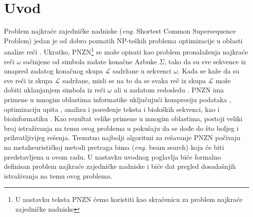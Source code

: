 \documentclass[12pt,oneside]{memoir}
\begin{document}
\frontmatter
\naslovna
\komisija
\apstrakt
\tableofcontents*

\mainmatter

\chapter{Uvod}
Problem najkraće zajedničke nadniske (\textit{eng.} Shortest Common Supersequence Problem)
jedan je od dobro poznatih NP-teških problema optimizacije u oblasti analize reči \cite{ProbabilisticBS}.
Ukratko, PNZN\footnote{U nastavku teksta PNZN ćemo koristiti kao skraćenicu za problem najkraće zajedničke nadniske}
se može opisati kao problem pronalaženja najkraće reči $\omega$ sačinjene
od simbola zadate konačne Azbuke $\Sigma$, tako da su sve sekvence iz unapred zadatog konačnog skupa
$\mathcal{L}$ sadržane u sekvenci $\omega$. Kada se kaže da su sve reči iz skupa $\mathcal{L}$
sadržane, misli se na to da se svaka reč iz skupa $\mathcal{L}$ može dobiti uklanjanjem simbola iz reči $\omega$ ali 
u zadatom redosledu \cite{SCSSProblemDef}. PNZN ima primene u mnogim oblastima informatike uključujući kompresiju podataka
\cite{DataCompression}, optimizaciju upita \cite{MQOptimization}, analizu i poređenje teksta i bioloških sekvenci, \cite{ITAlgorithms} \cite{SeqComparison}
kao i bioinformatiku \cite{ProbabilisticBS}.
Kao rezultat velike primene u mnogim oblastima, postoji veliki broj istraživanja na temu ovog problema u pokušaju da se dođe
do što boljeg i prihvatljivijeg rešenja. Trenutno najbolji algoritmi za rešavanje PNZN počivaju na metaheurističkoj metodi
pretraga bima (\textit{eng.} beam search) koja će biti predstavljena u ovom radu. U nastavku uvodnog poglavlja biće formalno
definisan problem najkraće zajedničke nadniske i biće dat pregled dosadašnjih istraživanja na temu ovog problema.
\end{document}
